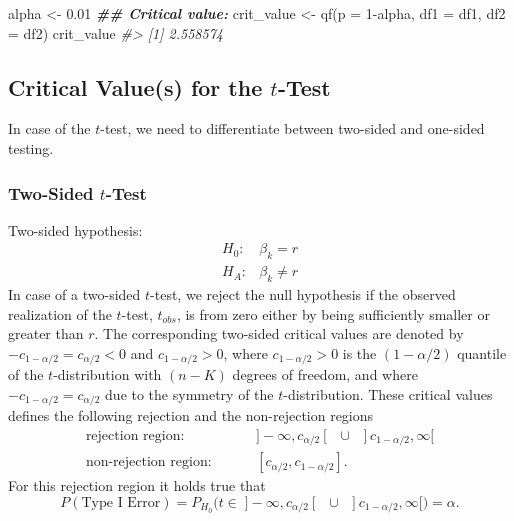 \documentclass[
  14pt,
]{memoir}
\newenvironment{Shaded}{\begin{snugshade}}{\end{snugshade}}
\newcommand{\AttributeTok}[1]{\textcolor[rgb]{0.77,0.63,0.00}{#1}}
\newcommand{\CommentTok}[1]{\textcolor[rgb]{0.56,0.35,0.01}{\textit{#1}}}
\newcommand{\DecValTok}[1]{\textcolor[rgb]{0.00,0.00,0.81}{#1}}
\newcommand{\DocumentationTok}[1]{\textcolor[rgb]{0.56,0.35,0.01}{\textbf{\textit{#1}}}}
\newcommand{\FloatTok}[1]{\textcolor[rgb]{0.00,0.00,0.81}{#1}}
\newcommand{\FunctionTok}[1]{\textcolor[rgb]{0.00,0.00,0.00}{#1}}
\newcommand{\NormalTok}[1]{#1}
\newcommand{\OtherTok}[1]{\textcolor[rgb]{0.56,0.35,0.01}{#1}}
\newcommand{\SpecialCharTok}[1]{\textcolor[rgb]{0.00,0.00,0.00}{#1}}
\begin{document}
\begin{Shaded}
\begin{Highlighting}[]
\NormalTok{alpha }\OtherTok{\textless{}{-}} \FloatTok{0.01}
\DocumentationTok{\#\# Critical value:}
\NormalTok{crit\_value }\OtherTok{\textless{}{-}} \FunctionTok{qf}\NormalTok{(}\AttributeTok{p =} \DecValTok{1}\SpecialCharTok{{-}}\NormalTok{alpha, }\AttributeTok{df1 =}\NormalTok{ df1, }\AttributeTok{df2 =}\NormalTok{ df2)}
\NormalTok{crit\_value}
\CommentTok{\#\textgreater{} [1] 2.558574}
\end{Highlighting}
\end{Shaded}

\hypertarget{critical-values-for-the-t-test}{%
\subsection{\texorpdfstring{Critical Value(s) for the \(t\)-Test}{Critical Value(s) for the t-Test}}\label{critical-values-for-the-t-test}}

In case of the \(t\)-test, we need to differentiate between two-sided and one-sided testing.

\hypertarget{two-sided-t-test}{%
\subsubsection*{\texorpdfstring{Two-Sided \(t\)-Test}{Two-Sided t-Test}}\label{two-sided-t-test}}

Two-sided hypothesis:
\begin{equation*}
\begin{array}{ll}
H_0: & \beta_k=r \\
H_A: & \beta_k\ne r
\end{array}
\end{equation*}
In case of a two-sided \(t\)-test, we reject the null hypothesis if the observed realization of the \(t\)-test, \(t_{obs}\), is  from zero either by being sufficiently smaller or greater than \(r\). The corresponding two-sided critical values are denoted by \(-c_{1-\alpha/2}=c_{\alpha/2}<0\) and \(c_{1-\alpha/2}>0\), where \(c_{1-\alpha/2}>0\) is the \((1-\alpha/2)\) quantile of the \(t\)-distribution with \((n-K)\) degrees of freedom, and where \(-c_{1-\alpha/2}=c_{\alpha/2}\) due to the symmetry of the \(t\)-distribution. These critical values defines the following rejection and the non-rejection regions
\begin{align*}
\text{rejection region:}&\hspace{1cm}]-\infty,c_{\alpha/2}[\;\;\cup\;\;]c_{1-\alpha/2}, \infty[\\
\text{non-rejection region:}&\hspace{1cm}[c_{\alpha/2},c_{1-\alpha/2}].
\end{align*}
For this rejection region it holds true that
\[
P(\text{Type I Error})=P_{H_0}\Big(t\in\;]-\infty,c_{\alpha/2}[\;\;\cup\;\;]c_{1-\alpha/2}, \infty[\Big)=\alpha.
\]
\end{document}
